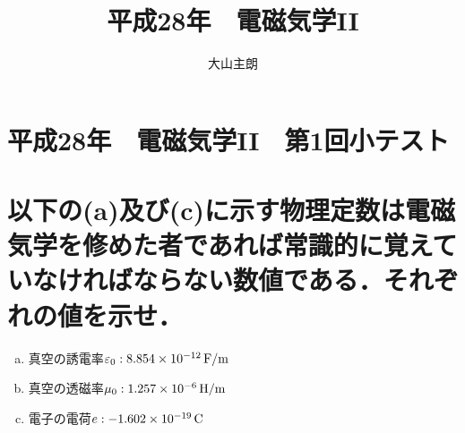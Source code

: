 \documentclass[dvipdfmx]{ujarticle}
\begin{document}
\title{平成28年　電磁気学II}
\date{}
\author{大山主朗}

\maketitle

\section*{平成28年　電磁気学II　第1回小テスト}
\section{以下の(a)及び(c)に示す物理定数は電磁気学を修めた者であれば常識的に覚えていなければならない数値である．それぞれの値を示せ．}
\begin{enumerate}[(a)]
	\item 真空の誘電率$\varepsilon_{0}:8.854 \times 10^{-12}\,\rm{F/m}$
	\item 真空の透磁率$\mu_{0}:1.257 \times 10^{-6}\,\rm{H/m}$
	\item 電子の電荷$e:-1.602 \times 10^{-19}\,\rm{C}$
\end{enumerate}
\end{document}
